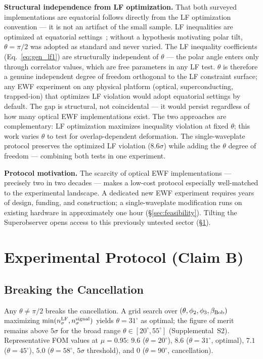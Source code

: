 \documentclass[twocolumn,aps,pra,superscriptaddress,floatfix,10pt]{revtex4-2}
\begin{document}
\textbf{Structural independence from LF optimization.} That both surveyed
implementations are equatorial follows directly from the LF optimization
convention --- it is not an artifact of the small sample. LF inequalities
are optimized at equatorial settings~\cite{Bong2020,Wiseman2023}; without a hypothesis
motivating polar tilt, $\theta = \pi/2$ was adopted as standard and never varied.
The LF inequality coefficients (Eq.~\ref{eq:gen_lf1}) are structurally independent of $\theta$
--- the polar angle enters only through correlator values, which are free
parameters in any LF test. $\theta$ is therefore a genuine independent degree of
freedom orthogonal to the LF constraint surface; any EWF experiment on
any physical platform (optical, superconducting, trapped-ion) that
optimizes LF violation would adopt equatorial settings by default. The
gap is structural, not coincidental --- it would persist regardless of how
many optical EWF implementations exist. The two approaches are
complementary: LF optimization maximizes inequality violation at fixed $\theta$;
this work varies $\theta$ to test for overlap-dependent deformation. The
single-waveplate protocol preserves the optimized LF violation ($8.6\sigma$)
while adding the $\theta$ degree of freedom --- combining both tests in one
experiment.

\textbf{Protocol motivation.} The scarcity of optical EWF implementations ---
precisely two in two decades --- makes a low-cost protocol especially
well-matched to the experimental landscape. A dedicated new EWF experiment
requires years of design, funding, and construction; a single-waveplate
modification runs on existing hardware in approximately one hour (\S\ref{sec:feasibility}).
Tilting the Superobserver opens access to this previously untested sector (\S\ref{sec:protocol}).

\section{Experimental Protocol (Claim B)}
\label{sec:protocol}

\subsection{Breaking the Cancellation}
\label{sec:breaking}

Any $\theta \neq \pi/2$ breaks the cancellation. A grid search over
$(\theta, \phi_2, \phi_3, \beta_{\rm Bob})$
maximizing $\min(n_\sigma^{\rm LF}, n_\sigma^{\rm signal})$ yields
$\theta = 31^\circ$ as optimal; the figure of
merit remains above $5\sigma$ for the broad range $\theta \in [20^\circ, 55^\circ]$
(Supplemental~S2).
Representative FOM values at $\mu = 0.95$: $9.6$ ($\theta = 20^\circ$), $8.6$ ($\theta = 31^\circ$, optimal),
$7.1$ ($\theta = 45^\circ$), $5.0$ ($\theta = 58^\circ$, $5\sigma$ threshold), and $0$ ($\theta = 90^\circ$, cancellation).
\end{document}
